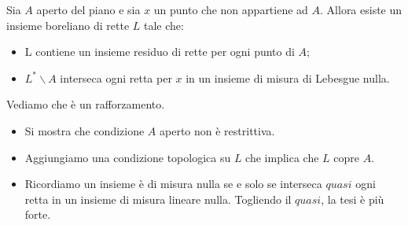 \documentclass[11pt]{beamer} %
\newcommand{\<}{\langle}
\renewcommand{\>}{\rangle}
\theoremstyle{theorem}
\theoremstyle{theorem}
\theoremstyle{theorem}
\theoremstyle{theorem}
\theoremstyle{theorem}
\begin{document}
\begin{frame}[fragile]

\begin{lemma}
	Sia $A$ aperto del piano e sia $x$ un punto che non appartiene ad $A$. Allora esiste un insieme boreliano di rette $L$ tale che:\\
	\begin{itemize}
		\item L contiene un insieme residuo di rette per ogni punto di $A$;\\
		\item $L^{*} \backslash A$ interseca ogni retta per $x$ in un insieme di misura di Lebesgue nulla.\\
	\end{itemize}
\end{lemma}
	\pause
	Vediamo che è un rafforzamento.\\
	\pause
	\begin{itemize}
		\item Si mostra che condizione $A$ aperto non è restrittiva.\\
		\pause
		\item Aggiungiamo una condizione topologica su $L$ che implica che $L$ copre $A$.\\
		\pause
		\item Ricordiamo un insieme è di misura nulla se e solo se interseca $quasi$ ogni retta in un insieme di misura lineare nulla. Togliendo il $quasi$, la tesi è più forte.\\
	\end{itemize}

\end{frame}
\end{document}
